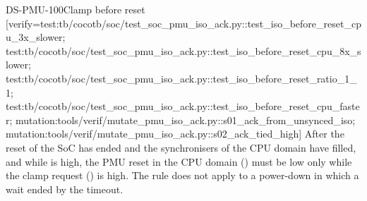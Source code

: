 \begin{requirement}{DS-PMU-100}{Clamp before reset}
[verify={test:tb/cocotb/soc/test_soc_pmu_iso_ack.py::test_iso_before_reset_cpu_3x_slower; test:tb/cocotb/soc/test_soc_pmu_iso_ack.py::test_iso_before_reset_cpu_8x_slower; test:tb/cocotb/soc/test_soc_pmu_iso_ack.py::test_iso_before_reset_ratio_1_1; test:tb/cocotb/soc/test_soc_pmu_iso_ack.py::test_iso_before_reset_cpu_faster; mutation:tools/verif/mutate_pmu_iso_ack.py::s01_ack_from_unsynced_iso; mutation:tools/verif/mutate_pmu_iso_ack.py::s02_ack_tied_high}]
After the reset of the SoC has ended and the synchronisers of the CPU domain have filled, and while  is high, the PMU reset in the CPU domain () must be low only while the clamp request () is high. The rule does not apply to a power-down in which a wait ended by the timeout.
\end{requirement}
